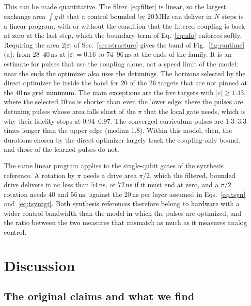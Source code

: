\documentclass[aps,prx,twocolumn,superscriptaddress,nofootinbib,amsmath,amssymb,floatfix]{revtex4-2}
\newcommand{\ns}{\,\mathrm{ns}}
\newcommand{\MHz}{\,\mathrm{MHz}}
\begin{document}
This can be made quantitative. The filter~\eqref{eq:filter} is linear, so the largest exchange area
$\int g\,dt$ that a control bounded by $20\MHz$ can deliver in $N$ steps is a linear program, with or
without the condition that the filtered coupling is back at zero at the last step, which the boundary term
of Eq.~\eqref{eq:ufo} enforces softly. Requiring the area $2|\varepsilon|$ of Sec.~\ref{sec:structure}
gives the band of Fig.~\ref{fig:runtime}(a): from $28$--$40\ns$ at $|\varepsilon|=0.16$ to $74$--$96\ns$
at the ends of the family. It is an estimate for pulses that use the coupling alone, not a speed limit of
the model; near the ends the optimizer also uses the detunings. The horizons selected by the direct
optimizer lie inside the band for $20$ of the $26$ targets that are not pinned at the $40\ns$ grid
minimum. The main exceptions are the five targets with $|\varepsilon|\ge1.43$, where the selected $70\ns$
is shorter than even the lower edge: there the pulses are detuning pulses whose area falls short of the
$\pi$ that the local gate needs, which is why their fidelity stops at $0.94$--$0.97$. The converged
curriculum pulses are $1.3$--$3.3$ times longer than the upper edge (median $1.8$). Within this model,
then, the durations chosen by the direct optimizer largely track the coupling-only bound, and those of the
learned pulses do not.

The same linear program applies to the single-qubit gates of the synthesis reference. A rotation by
$\pi$ needs a drive area $\pi/2$, which the filtered, bounded drive delivers in no less than $54\ns$, or
$72\ns$ if it must end at zero, and a $\pi/2$ rotation needs $40$ and $56\ns$, against the $20\ns$ per
layer assumed in Eqs.~\eqref{eq:tsyn} and~\eqref{eq:tsyntgt}. Both synthesis references therefore
belong to hardware with a wider control bandwidth than the model in which the pulses are optimized, and
the ratio between the two measures that mismatch as much as it measures analog control.

\section{Discussion}
\label{sec:discussion}

\subsection{The original claims and what we find}
\label{sec:claims}
\end{document}
